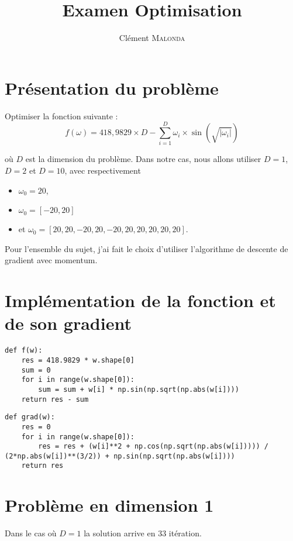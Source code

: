 \documentclass[12pt]{article}
\begin{document}
\title{Examen Optimisation}
\author{Clément \textsc{Malonda}}
\maketitle

\lstset{language=python}

\section*{Présentation du problème}

Optimiser la fonction suivante :
$$f(\omega) = 418,9829\times D - \sum_{i=1}^{D}\omega_i \times \sin(\sqrt{|\omega_i|})$$

où $D$ est la dimension du problème. Dans notre cas, nous allons utiliser $D = 1$, $D = 2$ et $D = 10$, avec respectivement
\begin{itemize}
    \item[\textbullet] $\omega_0 = 20$,
    \item[\textbullet] $\omega_0 = [-20, 20]$
    \item[\textbullet]et $\omega_0 = [20, 20, -20, 20, -20, 20, 20, 20, 20, 20]$.
\end{itemize}

Pour l'ensemble du sujet, j'ai fait le choix d'utiliser l'algorithme de descente de gradient avec momentum.

\section{Implémentation de la fonction et de son gradient}
\begin{lstlisting}
def f(w):
    res = 418.9829 * w.shape[0]
    sum = 0
    for i in range(w.shape[0]):
        sum = sum + w[i] * np.sin(np.sqrt(np.abs(w[i])))
    return res - sum
\end{lstlisting}

\begin{lstlisting}
def grad(w):
    res = 0
    for i in range(w.shape[0]):
        res = res + (w[i]**2 + np.cos(np.sqrt(np.abs(w[i])))) / (2*np.abs(w[i])**(3/2)) + np.sin(np.sqrt(np.abs(w[i])))
    return res
\end{lstlisting}

\section{Problème en dimension 1}

Dans le cas où $D=1$ la solution arrive en 33 itération.
\end{document}
